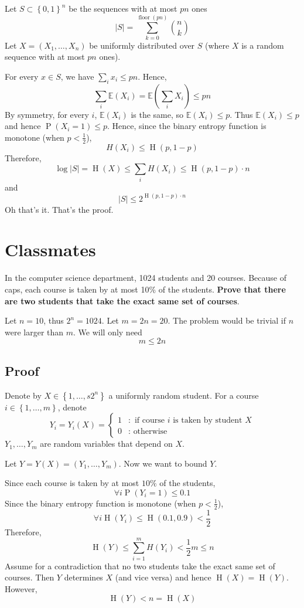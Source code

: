 \documentclass{article}
\begin{document}
Let $S\subset \left\{0,1\right\}^n$ be the sequences with at most $pn$ ones
\[
\lvert S \rvert = \sum_{k=0 }^{\operatorname{floor}\left(pn\right)}\binom{n }{k }
\]
Let $X=\left(X_1,\ldots, X_n\right)$ be uniformly distributed over $S$ (where $X$ is a random sequence with at most $pn$ ones).

For every $x\in S$, we have $\sum_i x_i \leq pn$. Hence,
\[
\sum_i \mathbb{E}\left(X_i\right) = \mathbb{E}\left(\sum_i X_i\right)\leq pn
\]
By symmetry, for every $i$, $\mathbb{E}(X_i)$ is the same, so $\mathbb{E}(X_i)\leq p$. Thus $\mathbb{E}(X_i)\leq p$ and hence $\operatorname{P}\left(X_i = 1\right)\leq p$. Hence, since the binary entropy function is monotone (when $p<\frac{1}{2}$),
\[
H\left(X_i\right)\leq \operatorname{H}\left(p,1-p\right)
\]
Therefore, 
\[
\log \lvert S \rvert = \operatorname{H}(X) \leq \sum_i H(X_i)\leq \operatorname{H}\left(p, 1-p\right)\cdot n
\]
and
\[
\lvert S \rvert \leq 2^{\operatorname{H}\left(p,1-p\right)\cdot n}
\]
Oh that's it. That's the proof.

\section{Classmates}

In the computer science department, 1024 students and 20 courses. Because of caps, each course is taken by at most 10\% of the students. \textbf{Prove that there are two students that take the exact same set of courses}.

Let $n=10$, thus $2^n = 1024$. Let $m=2n=20$. The problem would be trivial if $n$ were larger than $m$. We will only need
\[
m\leq 2n
\]

\subsection{Proof}

Denote by $X\in \left\{1,\ldots,s 2^n\right\}$ a uniformly random student. For a course $i\in \left\{1,\ldots, m\right\}$, denote 
\[
Y_i = Y_i(X)= \begin{cases}
    1 &: \text{ if course } i \text{ is taken by student } X\\
    0 &: \text{ otherwise}
\end{cases}
\]
$Y_1,\ldots,Y_m$ are random variables that depend on $X$.

Let $Y=Y(X) =\left(Y_1, \ldots, Y_m\right)$. Now we want to bound $Y$.

Since each course is taken by at most $10\%$ of the students, 
\[
\forall i \operatorname{P}\left(Y_i = 1\right) \leq 0.1
\]
Since the binary entropy function is monotone (when $p< \frac{1}{2}$),
\[
\forall i \operatorname{H}(Y_i)\leq \operatorname{H}\left(0.1, 0.9\right) < \frac{1 }{2}
\]
Therefore, 
\[
\operatorname{H}\left(Y \right) \leq \sum_{i=1 }^{m }H(Y_i) < \frac{1}{2}m  \leq n
\]
Assume for a contradiction that no two students take the exact same set of courses. Then $Y$ determines $X$ (and vice versa) and hence $\operatorname{H}(X)=\operatorname{H}(Y)$. However,
\[
\operatorname{H}(Y) < n = \operatorname{H}(X)
\]
\end{document}
